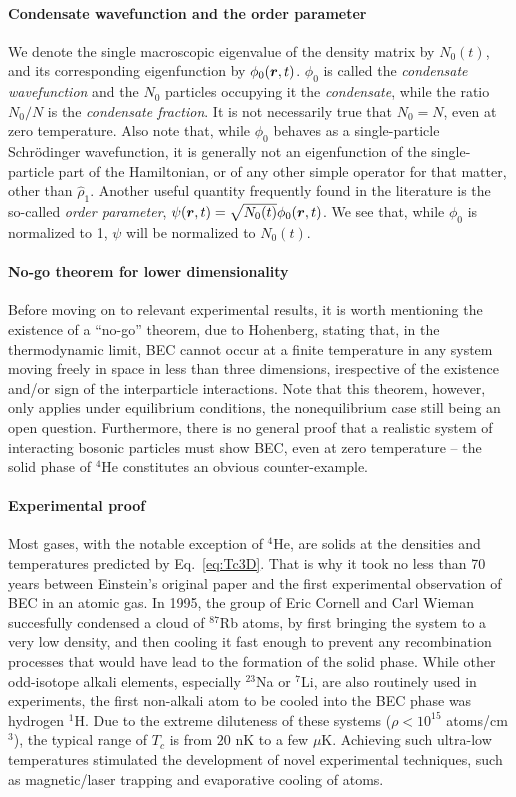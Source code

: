\paragraph{Condensate wavefunction and the order parameter}
We denote the single macroscopic eigenvalue of the density matrix by
$N_0(t)$, and its corresponding eigenfunction by
$\phi_0(\bm{r},t)$. $\phi_0$ is called the \textit{condensate
  wavefunction} and the $N_0$ particles occupying it the
\textit{condensate}, while the ratio $N_0/N$ is the \textit{condensate
  fraction}. It is not necessarily true that $N_0 = N$, even at zero
temperature. Also note that, while $\phi_0$ behaves as a
single-particle Schr\"{o}dinger wavefunction, it is generally not an
eigenfunction of the single-particle part of the Hamiltonian, or of
any other simple operator for that matter, other than
$\hat{\rho}_1$. Another useful quantity frequently found in the
literature is the so-called \textit{order parameter},
$\psi(\bm{r},t) = \sqrt{N_0(t)}\phi_0(\bm{r},t)$. We see that, while
$\phi_0$ is normalized to 1, $\psi$ will be normalized to $N_0(t)$.

\paragraph{No-go theorem for lower dimensionality}
Before moving on to relevant experimental results, it is worth
mentioning the existence of a ``no-go'' theorem, due to Hohenberg,
stating that, in the thermodynamic limit, BEC cannot occur at a finite
temperature in any system moving freely in space in less than three
dimensions, irespective of the existence and/or sign of the
interparticle interactions. Note that this theorem, however, only
applies under equilibrium conditions, the nonequilibrium case still
being an open question.  Furthermore, there is no general proof that a
realistic system of interacting bosonic particles must show BEC, even
at zero temperature -- the solid phase of ${}^4$He constitutes an
obvious counter-example.

\paragraph{Experimental proof}
Most gases, with the notable exception of ${}^4$He, are solids at the
densities and temperatures predicted by Eq.~\eqref{eq:Tc3D}. That is
why it took no less than 70 years between Einstein's original paper
and the first experimental observation of BEC in an atomic gas. In
1995, the group of Eric Cornell and Carl Wieman succesfully condensed
a cloud of ${}^{87}$Rb atoms, by first bringing the system to a very
low density, and then cooling it fast enough to prevent any
recombination processes that would have lead to the formation of the
solid phase. While other odd-isotope alkali elements, especially
${}^{23}$Na or ${}^{7}$Li, are also routinely used in experiments, the
first non-alkali atom to be cooled into the BEC phase was hydrogen
${}^1$H. Due to the extreme diluteness of these systems
($\rho < 10^{15}$ atoms/cm${}^3$), the typical range of $T_c$ is from
$20$ nK to a few $\mu$K. Achieving such ultra-low temperatures
stimulated the development of novel experimental techniques, such as
magnetic/laser trapping and evaporative cooling of atoms.


